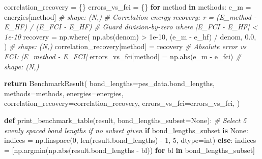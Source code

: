 \documentclass[
  11pt,
]{report}
\newenvironment{Shaded}{}{}
\newcommand{\BuiltInTok}[1]{\textcolor[rgb]{0.00,0.50,0.00}{#1}}
\newcommand{\CommentTok}[1]{\textcolor[rgb]{0.38,0.63,0.69}{\textit{#1}}}
\newcommand{\ControlFlowTok}[1]{\textcolor[rgb]{0.00,0.44,0.13}{\textbf{#1}}}
\newcommand{\DecValTok}[1]{\textcolor[rgb]{0.25,0.63,0.44}{#1}}
\newcommand{\FloatTok}[1]{\textcolor[rgb]{0.25,0.63,0.44}{#1}}
\newcommand{\KeywordTok}[1]{\textcolor[rgb]{0.00,0.44,0.13}{\textbf{#1}}}
\newcommand{\NormalTok}[1]{#1}
\newcommand{\OperatorTok}[1]{\textcolor[rgb]{0.40,0.40,0.40}{#1}}
\newcommand{\VariableTok}[1]{\textcolor[rgb]{0.10,0.09,0.49}{#1}}
\begin{document}
\begin{Shaded}
\begin{Highlighting}[]
\NormalTok{    correlation\_recovery }\OperatorTok{=}\NormalTok{ \{\}}
\NormalTok{    errors\_vs\_fci }\OperatorTok{=}\NormalTok{ \{\}}
    \ControlFlowTok{for}\NormalTok{ method }\KeywordTok{in}\NormalTok{ methods:}
\NormalTok{        e\_m }\OperatorTok{=}\NormalTok{ energies[method]                     }\CommentTok{\# shape: (N,)}
        \CommentTok{\# Correlation energy recovery: r = (E\_method {-} E\_HF) / (E\_FCI {-} E\_HF)}
        \CommentTok{\# Guard division{-}by{-}zero where |E\_FCI {-} E\_HF| \textless{} 1e{-}10}
\NormalTok{        recovery }\OperatorTok{=}\NormalTok{ np.where(}
\NormalTok{            np.}\BuiltInTok{abs}\NormalTok{(denom) }\OperatorTok{\textgreater{}} \FloatTok{1e{-}10}\NormalTok{,}
\NormalTok{            (e\_m }\OperatorTok{{-}}\NormalTok{ e\_hf) }\OperatorTok{/}\NormalTok{ denom,}
            \FloatTok{0.0}\NormalTok{,}
\NormalTok{        )                                          }\CommentTok{\# shape: (N,)}
\NormalTok{        correlation\_recovery[method] }\OperatorTok{=}\NormalTok{ recovery}
        \CommentTok{\# Absolute error vs FCI: |E\_method {-} E\_FCI|}
\NormalTok{        errors\_vs\_fci[method] }\OperatorTok{=}\NormalTok{ np.}\BuiltInTok{abs}\NormalTok{(e\_m }\OperatorTok{{-}}\NormalTok{ e\_fci)  }\CommentTok{\# shape: (N,)}

    \ControlFlowTok{return}\NormalTok{ BenchmarkResult(}
\NormalTok{        bond\_lengths}\OperatorTok{=}\NormalTok{pes\_data.bond\_lengths,}
\NormalTok{        methods}\OperatorTok{=}\NormalTok{methods, energies}\OperatorTok{=}\NormalTok{energies,}
\NormalTok{        correlation\_recovery}\OperatorTok{=}\NormalTok{correlation\_recovery,}
\NormalTok{        errors\_vs\_fci}\OperatorTok{=}\NormalTok{errors\_vs\_fci,}
\NormalTok{    )}


\KeywordTok{def}\NormalTok{ print\_benchmark\_table(result, bond\_lengths\_subset}\OperatorTok{=}\VariableTok{None}\NormalTok{):}
    \CommentTok{\# Select 5 evenly spaced bond lengths if no subset given}
    \ControlFlowTok{if}\NormalTok{ bond\_lengths\_subset }\KeywordTok{is} \VariableTok{None}\NormalTok{:}
\NormalTok{        indices }\OperatorTok{=}\NormalTok{ np.linspace(}\DecValTok{0}\NormalTok{, }\BuiltInTok{len}\NormalTok{(result.bond\_lengths) }\OperatorTok{{-}} \DecValTok{1}\NormalTok{, }\DecValTok{5}\NormalTok{, dtype}\OperatorTok{=}\BuiltInTok{int}\NormalTok{)}
    \ControlFlowTok{else}\NormalTok{:}
\NormalTok{        indices }\OperatorTok{=}\NormalTok{ [np.argmin(np.}\BuiltInTok{abs}\NormalTok{(result.bond\_lengths }\OperatorTok{{-}}\NormalTok{ bl))}
                   \ControlFlowTok{for}\NormalTok{ bl }\KeywordTok{in}\NormalTok{ bond\_lengths\_subset]}


\end{Highlighting}
\end{Shaded}
\end{document}
